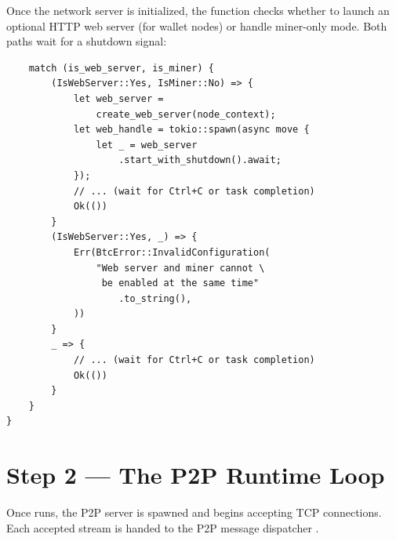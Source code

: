 Once the network server is initialized, the function checks whether to launch an optional HTTP web server (for wallet nodes) or handle miner-only mode. Both paths wait for a shutdown signal:

\begin{verbatim}
    match (is_web_server, is_miner) {
        (IsWebServer::Yes, IsMiner::No) => {
            let web_server =
                create_web_server(node_context);
            let web_handle = tokio::spawn(async move {
                let _ = web_server
                    .start_with_shutdown().await;
            });
            // ... (wait for Ctrl+C or task completion)
            Ok(())
        }
        (IsWebServer::Yes, _) => {
            Err(BtcError::InvalidConfiguration(
                "Web server and miner cannot \
                 be enabled at the same time"
                    .to_string(),
            ))
        }
        _ => {
            // ... (wait for Ctrl+C or task completion)
            Ok(())
        }
    }
}
\end{verbatim}

\section{Step 2 --- The P2P Runtime Loop}
\label{sec:ch09-9-step2}

Once  runs, the P2P server is spawned and begins accepting TCP connections. Each accepted stream is handed to the P2P message dispatcher .

